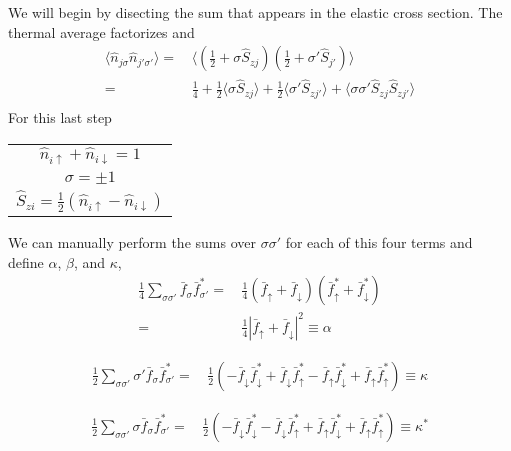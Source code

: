 \documentclass[11pt,letter]{article}
\begin{document}
We will begin by disecting the sum that appears in the elastic cross section. The thermal average factorizes and
\begin{equation}
\begin{split}
\langle \hat{n}_{j\sigma}\hat{n}_{j'\sigma'} \rangle = &\, \langle (\frac{1}{2} + \sigma\hat{S}_{zj} )( \frac{1}{2} + \sigma'\hat{S}_{j'} ) \rangle \\
       = &\, \frac{1}{4} + \frac{1}{2} \langle \sigma \hat{S}_{zj} \rangle +
\frac{1}{2} \langle \sigma'\hat{S}_{zj'} \rangle + \langle \sigma\sigma'\hat{S}_{zj}\hat{S}_{zj'}
\rangle \\
\end{split}
\end{equation}
For this last step
\begin{center}
  \begin{tabular}{ c }
    $\hat{n}_{i\uparrow} + \hat{n}_{i\downarrow} = 1$ \\
    $\sigma = \pm 1$ \\
    $\hat{S}_{zi} = \frac{1}{2}( \hat{n}_{i\uparrow} - \hat{n}_{i\downarrow} )$
  \end{tabular}
\end{center}
We can manually perform the sums over $\sigma\sigma'$ for each of this four terms and define $\alpha$, $\beta$, and $\kappa$,
\begin{equation}
\begin{split}
\frac{1}{4} \sum_{\sigma\sigma'} \bar{f}_{\sigma} \bar{f}_{\sigma'}^{*} = &\,
            \frac{1}{4}(\bar{f}_{\uparrow} + \bar{f}_{\downarrow})( \bar{f}_{\uparrow}^{*} + \bar{f}_{\downarrow}^{*} ) \\
       =&\, \frac{1}{4} | \bar{f}_{\uparrow} + \bar{f}_{\downarrow} | ^{2} \equiv \alpha
\end{split}
\end{equation}

\begin{equation}
\begin{split}
\frac{1}{2} \sum_{\sigma\sigma'} \sigma'\bar{f}_{\sigma} \bar{f}_{\sigma'}^{*} = &\,
  \frac{1}{2} (
            - \bar{f}_{\downarrow}\bar{f}_{\downarrow}^{*}
            + \bar{f}_{\downarrow}\bar{f}_{\uparrow}^{*}
            - \bar{f}_{\uparrow}\bar{f}_{\downarrow}^{*}
            + \bar{f}_{\uparrow}\bar{f}_{\uparrow}^{*} ) \equiv \kappa
\end{split}
\end{equation}

\begin{equation}
\begin{split}
\frac{1}{2} \sum_{\sigma\sigma'} \sigma \bar{f}_{\sigma} \bar{f}_{\sigma'}^{*} = &\,
  \frac{1}{2} (
            - \bar{f}_{\downarrow}\bar{f}_{\downarrow}^{*}
            - \bar{f}_{\downarrow}\bar{f}_{\uparrow}^{*}
            + \bar{f}_{\uparrow}\bar{f}_{\downarrow}^{*}
            + \bar{f}_{\uparrow}\bar{f}_{\uparrow}^{*} ) \equiv \kappa^{*}
\end{split}
\end{equation}
\end{document}
